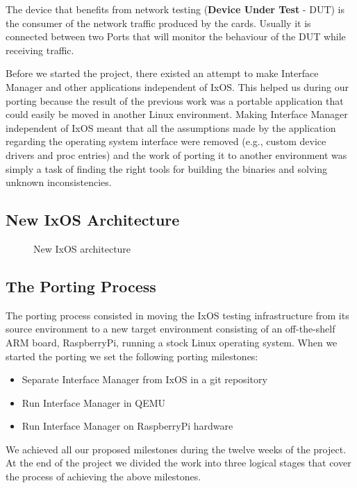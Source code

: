 The device that benefits from network testing (\textbf{Device Under Test} - DUT)
is the consumer
of the network traffic produced by the cards. Usually it is connected between
two Ports that will monitor the behaviour of the DUT while receiving traffic.

Before we started the project, there existed an attempt to make Interface Manager
and other applications independent of IxOS. This helped us during our porting
because the result of the previous work was a portable application that could
easily be moved in another Linux environment. Making Interface Manager
independent of IxOS meant that all the assumptions made by the application
regarding the operating system interface were removed (e.g., custom device
drivers and proc entries) and the work of porting it to another environment
was simply a task of finding the right tools for building the binaries and
solving unknown inconsistencies.

\subsection{New IxOS Architecture}

\begin{figure*}
    \centering
    \def\svgscale{0.95}
    
    \caption{New IxOS architecture}
    \label{fig:ixos_new_arch}
\end{figure*}

\subsection{The Porting Process}

The porting process consisted in moving the IxOS testing infrastructure from its
source environment to a new target environment consisting of an off-the-shelf
ARM board, RaspberryPi, running a stock Linux operating system. When we started
the porting we set the following porting milestones:
\begin{itemize}
    \item Separate Interface Manager from IxOS in a git repository
    \item Run Interface Manager in QEMU
    \item Run Interface Manager on RaspberryPi hardware
\end{itemize}
We achieved all our proposed milestones during the twelve weeks of the project.
At the end of the project we divided the work into three logical stages
that cover the process of achieving the above milestones.

